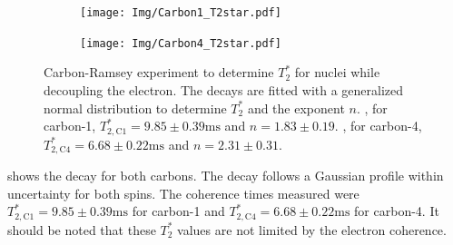 \begin{figure}[htbp]
    \begin{subfigure}[t]{0.49\textwidth}\centering
        \caption{}
        \texttt{[image: Img/Carbon1\_T2star.pdf]}
        \label{fig:T2star_carbon1}
    \end{subfigure}
    \begin{subfigure}[t]{0.49\textwidth}\centering
        \caption{}
        \texttt{[image: Img/Carbon4\_T2star.pdf]}
        \label{fig:T2star_carbon4}
    \end{subfigure}
    \caption{Carbon-Ramsey experiment to determine $T_2^*$ for nuclei while decoupling the electron.
    The decays are fitted with a generalized normal distribution to determine $T_2^*$ and the exponent $n$.
    , for carbon-1, $T_{2,\mathrm{C1}}^* =9.85 \pm   0.39 \mathrm{ms}$ and $n= 1.83 \pm 0.19$.
    , for carbon-4,  $T_{2,\mathrm{C4}}^* =6.68 \pm   0.22 \mathrm{ms}$ and $n= 2.31 \pm 0.31$. } %
    \label{fig:T2star_carbon}
\end{figure}

 shows the decay for both carbons.
The decay follows a Gaussian profile within uncertainty for both spins.
The coherence times measured were $T_{2,\mathrm{C1}}^* =9.85 \pm   0.39 \mathrm{ms}$ for carbon-1 and $T_{2,\mathrm{C4}}^* =6.68 \pm   0.22 \mathrm{ms}$ for carbon-4.
It should be noted that these $T_2^*$ values are not limited by the electron coherence.


